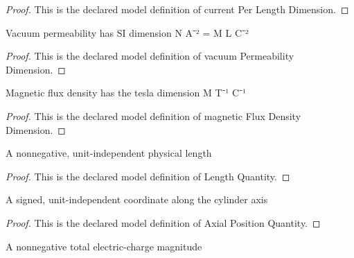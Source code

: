 \begin{proof}
  This is the declared model definition of current Per Length Dimension.
\end{proof}
\begin{definition}
  \label{def:physics:phyx-mini-0969:phyxminiproblems-problemphyxmini0969-vacuumpermeabilitydimension}
  Vacuum permeability has SI dimension N A⁻² = M L C⁻²
\end{definition}
\begin{proof}
  This is the declared model definition of vacuum Permeability Dimension.
\end{proof}
\begin{definition}
  \label{def:physics:phyx-mini-0969:phyxminiproblems-problemphyxmini0969-magneticfluxdensitydimension}
  Magnetic flux density has the tesla dimension M T⁻¹ C⁻¹
\end{definition}
\begin{proof}
  This is the declared model definition of magnetic Flux Density Dimension.
\end{proof}
\begin{definition}
  \label{def:physics:phyx-mini-0969:phyxminiproblems-problemphyxmini0969-lengthquantity}
  A nonnegative, unit-independent physical length
\end{definition}
\begin{proof}
  This is the declared model definition of Length Quantity.
\end{proof}
\begin{definition}
  \label{def:physics:phyx-mini-0969:phyxminiproblems-problemphyxmini0969-axialpositionquantity}
  A signed, unit-independent coordinate along the cylinder axis
\end{definition}
\begin{proof}
  This is the declared model definition of Axial Position Quantity.
\end{proof}
\begin{definition}
  \label{def:physics:phyx-mini-0969:phyxminiproblems-problemphyxmini0969-chargemagnitudequantity}
  A nonnegative total electric-charge magnitude
\end{definition}
